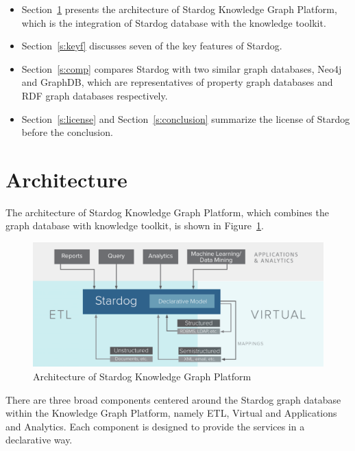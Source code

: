 		\begin{itemize}
			\item Section~\ref{s:arch} presents the architecture of Stardog 
			Knowledge Graph Platform, which is the integration of Stardog 
			database with the knowledge toolkit.
			
			\item Section~\ref{s:keyf} discusses seven of the key features of 
			Stardog.
			
			\item Section~\ref{s:comp} compares Stardog with two similar graph 
			databases, Neo4j and GraphDB, which are representatives of 
			property graph databases and RDF graph databases respectively.
		
			\item Section~\ref{s:license} and Section~\ref{s:conclusion} 
			summarize the license of Stardog before the conclusion.
		\end{itemize}

\section{Architecture}
\label{s:arch}
	The architecture of Stardog Knowledge Graph Platform, which combines 
	the graph database with knowledge toolkit, is shown in 
	Figure~\ref{sa:archi}.

	\begin{figure}[!ht]
	  \centering\includegraphics[width=\columnwidth]{images/stardog-architecture.png}
	  \caption{Architecture of Stardog Knowledge Graph 
	  Platform~\cite{hid-sp18-405-blog-stardog-kgraph}}\label{sa:archi}
	\end{figure}

	There are three broad components centered around the Stardog graph 
	database within the Knowledge Graph Platform, namely ETL, Virtual and 
	Applications and Analytics. Each component is designed to provide 
	the services in a declarative way. 
	
